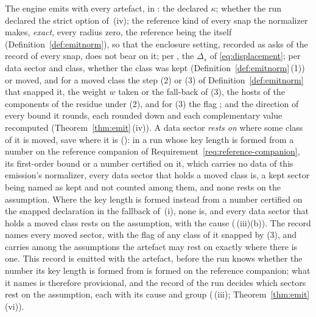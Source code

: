 \begin{requirement}\label{req:emission-record}
The engine emits with every artefact, in : the
declared  $\kappa$; whether the run declared the strict
option of \,(iv); the reference kind of
every snap the normalizer makes, \emph{exact}, every radius zero, the
reference being the  itself
(Definition~\ref{def:emitnorm}), so that the enclosure setting, recorded as
 asks of the record of every snap, does not
bear on it; per , the 
$\Delta_s$ of \eqref{eq:displacement}; per data sector and class, whether the
class was kept (Definition~\ref{def:emitnorm}\,(1)) or moved, and for a moved
class the step (2) or (3) of Definition~\ref{def:emitnorm} that snapped it,
the weight $w$ taken or the fall-back of (3), the hosts of the components of
the residue under (2), and for (3) the flag ; and
the direction of every bound it rounds, each  rounded
down and each complementary value recomputed (Theorem~\ref{thm:emit}\,(iv)).
A data sector \emph{rests on} 
where some class of it is moved, save where it is
 ():
in a run whose key length is formed from a number on the reference
companion of Requirement~\ref{req:reference-companion}, its first-order
bound or a number certified on it, which carries no data of this emission's
normalizer, every data sector that holds a moved class is, a kept sector
being named as kept and not counted among them, and none rests on the
assumption. Where the key length is formed instead from a number certified
on the snapped declaration in the fallback of
\,(i), none is, and
every data sector that holds a moved class rests on the assumption, with the
cause 
(\,(iii)(b)). The record names every moved sector, with the flag of any class
of it snapped by (3), and carries
 among the assumptions the
artefact may rest on exactly where there is one. This record is emitted with
the artefact, before the run knows whether the number its key length is
formed from is formed on the reference companion; what it names is therefore provisional, and the
record of the run decides which sectors rest on the assumption, each with
its cause and group (\,(iii);
Theorem~\ref{thm:emit}\,(vi)).
\end{requirement}
